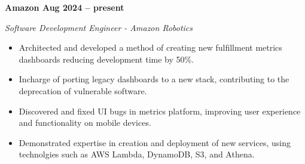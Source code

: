 \vspace{0.1cm}
\textbf{Amazon \hfill Aug 2024 -- present} \par
\textit{Software Development Engineer - Amazon Robotics} \par
\begin{itemize}
	\item Architected and developed a method of creating new fulfillment metrics dashboards reducing development time by 50\%.
    \item Incharge of porting legacy dashboards to a new stack, contributing to the deprecation of vulnerable software.
    \item Discovered and fixed UI bugs in metrics platform, improving user experience and functionality on mobile devices.
    \item Demonstrated expertise in creation and deployment of new services, using technolgies such as AWS Lambda, DynamoDB, S3, and Athena.
\end{itemize} \par